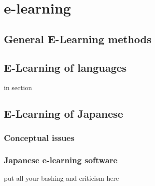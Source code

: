 \chapter{e-learning}
\section{General E-Learning methods}
\section{E-Learning of languages}
in section 
\section{E-Learning of Japanese}
\subsection{Conceptual issues}
\subsection{Japanese e-learning software}
put all your bashing and criticism here